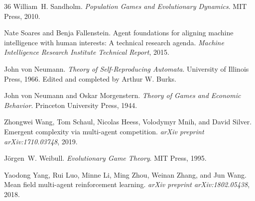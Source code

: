\documentclass[12pt]{article}
\begin{document}
\begin{thebibliography}{36}
William~H. Sandholm.
\newblock \emph{Population Games and Evolutionary Dynamics}.
\newblock MIT Press, 2010.

Nate Soares and Benja Fallenstein.
\newblock Agent foundations for aligning machine intelligence with human
  interests: A technical research agenda.
\newblock \emph{Machine Intelligence Research Institute Technical Report},
  2015.

John von Neumann.
\newblock \emph{Theory of Self-Reproducing Automata}.
\newblock University of Illinois Press, 1966.
\newblock Edited and completed by Arthur W. Burks.

John von Neumann and Oskar Morgenstern.
\newblock \emph{Theory of Games and Economic Behavior}.
\newblock Princeton University Press, 1944.

Zhongwei Wang, Tom Schaul, Nicolas Heess, Volodymyr Mnih, and David Silver.
\newblock Emergent complexity via multi-agent competition.
\newblock \emph{arXiv preprint arXiv:1710.03748}, 2019.

J{\"o}rgen~W. Weibull.
\newblock \emph{Evolutionary Game Theory}.
\newblock MIT Press, 1995.

Yaodong Yang, Rui Luo, Minne Li, Ming Zhou, Weinan Zhang, and Jun Wang.
\newblock Mean field multi-agent reinforcement learning.
\newblock \emph{arXiv preprint arXiv:1802.05438}, 2018.

\end{thebibliography}


\appendix



\appendix
\end{document}

